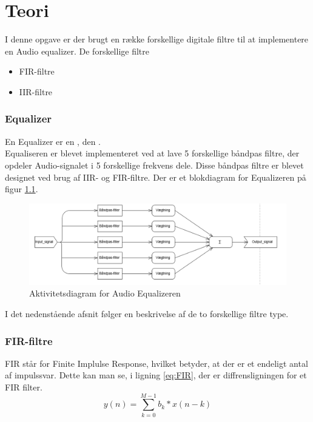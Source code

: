 \chapter{Teori}\label{ch:Teroi}

I denne opgave er der brugt en række forskellige digitale filtre til at implementere en Audio equalizer. De forskellige filtre 
\begin{itemize}
\item FIR-filtre
\item IIR-filtre

\end{itemize}

\subsection{Equalizer}
En Equalizer er en , den .\\
Equaliseren er blevet implementeret ved at lave 5 forskellige båndpas filtre, der opdeler Audio-signalet i 5 forskellige frekvens dele. Disse båndpas filtre er blevet designet ved brug af IIR- og FIR-filtre. 
Der er et blokdiagram for Equalizeren på figur \ref{fig:Aktivitetsdiagram for Equalizeren}.

\begin{figure}[H]
	\centering
	\includegraphics[width=150mm]{figures/Equalizer_flowchart.PNG}
	\caption{Aktivitetsdiagram for Audio Equalizeren}
	\label{fig:Aktivitetsdiagram for Equalizeren}
\end{figure}

I det nedenstående afsnit følger en beskrivelse af de to forskellige filtre type.
 
\subsection{FIR-filtre}
FIR står for Finite Implulse Response, hvilket betyder, at der er et endeligt antal af impulssvar.
Dette kan man se, i ligning \eqref{eq:FIR}, der er diffrensligningen for et FIR filter.
\begin{equation}\label{eq:FIR}
{y(n)} = \displaystyle\sum_{k=0}^{M-1} {b_{k}*x(n-k)}
\end{equation}


